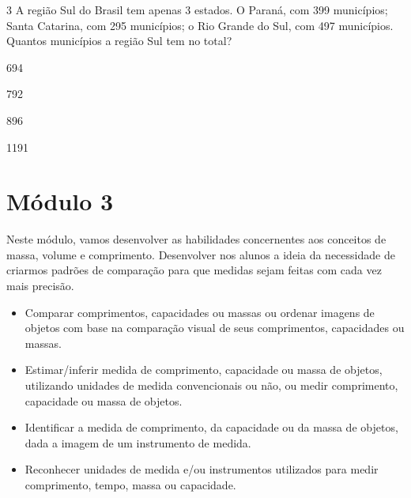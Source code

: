 \num{3} A região Sul do Brasil tem apenas 3 estados. O Paraná, com 399
municípios; Santa Catarina, com 295 municípios; o Rio Grande do Sul, com
497 municípios. Quantos municípios a região Sul tem no total?

\begin{minipage}{.5\textwidth}
\begin{escolha}
\item 694

\item 792

\item 896

\item 1191
\end{escolha}
\end{minipage}

\chapter{Módulo 3}

Neste módulo, vamos desenvolver as habilidades concernentes
aos conceitos de massa, volume e comprimento. Desenvolver nos alunos a
ideia da necessidade de criarmos padrões de comparação para que medidas
sejam feitas com cada vez mais precisão. 


\begin{itemize}
\item Comparar comprimentos, capacidades ou massas ou ordenar imagens de
  objetos com base na comparação visual de seus comprimentos, capacidades ou massas.
\item Estimar/inferir medida de comprimento, capacidade ou massa de objetos,
  utilizando unidades de medida convencionais ou não, ou medir
  comprimento, capacidade ou massa de objetos.
\item Identificar a medida de comprimento, da capacidade ou da massa de
  objetos, dada a imagem de um instrumento de medida.
\item Reconhecer unidades de medida e/ou instrumentos utilizados para medir
  comprimento, tempo, massa ou capacidade.
\end{itemize}

